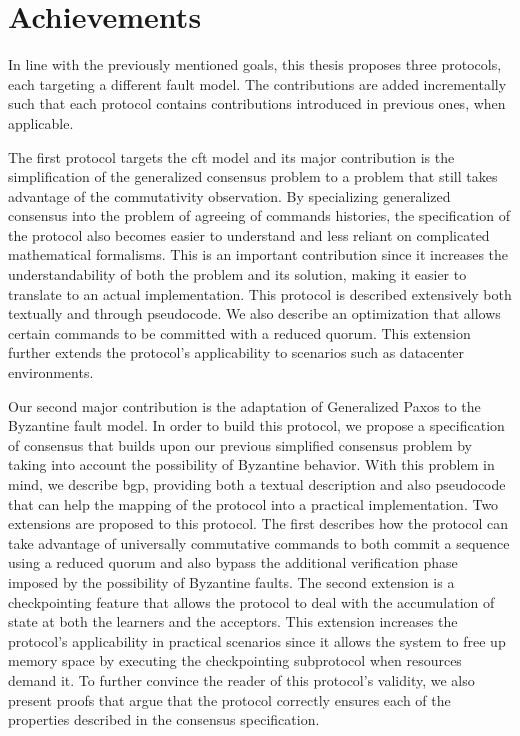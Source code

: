\section{Achievements}
In line with the previously mentioned goals, this thesis proposes three protocols, each targeting a different fault model. The contributions are added incrementally such that each protocol contains contributions introduced in previous ones, when applicable. \par
The first protocol targets the \acrshort{cft} model and its major contribution is the simplification of the generalized consensus problem to a problem that still takes advantage of the commutativity observation. By specializing generalized consensus into the problem of agreeing of commands histories, the specification of the protocol also becomes easier to understand and less reliant on complicated mathematical formalisms. This is an important contribution since it increases the understandability of both the problem and its solution, making it easier to translate to an actual implementation. This protocol is described extensively both textually and through pseudocode. We also describe an optimization that allows certain commands to be committed with a reduced quorum. This extension further extends the protocol's applicability to scenarios such as datacenter environments.\par
Our second major contribution is the adaptation of Generalized Paxos to the Byzantine fault model. In order to build this protocol, we propose a specification of consensus that builds upon our previous simplified consensus problem by taking into account the possibility of Byzantine behavior. With this problem in mind, we describe \acrlong{bgp}, providing both a textual description and also pseudocode that can help the mapping of the protocol into a practical implementation. Two extensions are proposed to this protocol. The first describes how the protocol can take advantage of universally commutative commands to both commit a sequence using a reduced quorum and also bypass the additional verification phase imposed by the possibility of Byzantine faults. The second extension is a checkpointing feature that allows the protocol to deal with the accumulation of state at both the learners and the acceptors. This extension increases the protocol's applicability in practical scenarios since it allows the system to free up memory space by executing the checkpointing subprotocol when resources demand it. To further convince the reader of this protocol's validity, we also present proofs that argue that the protocol correctly ensures each of the properties described in the consensus specification.\par
